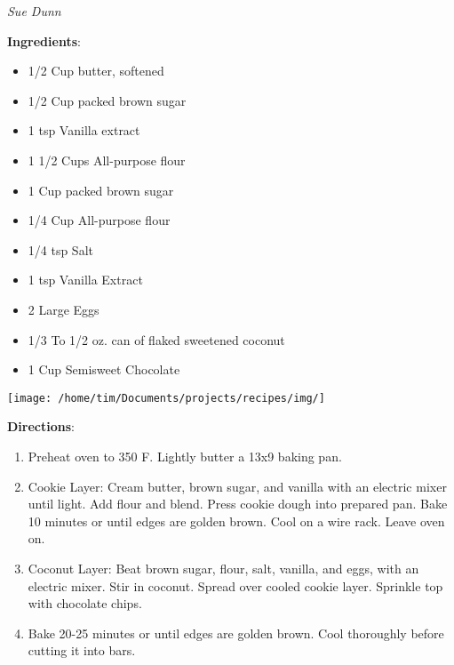 \documentclass[11pt, twoside, openany]{book}
\begin{document}
 \label{island-gem-bars}\hfill\textit{Sue Dunn}\\
\begin{minipage}[t]{0.8\linewidth}
\textbf{Ingredients}:\vspace{-3mm}
\begin{multicols}{2}
\begin{itemize}\setlength\itemsep{-1mm}
\item 1/2 Cup butter, softened
\item 1/2 Cup packed brown sugar
\item 1 tsp Vanilla extract
\item 1 1/2 Cups All-purpose flour
\item 1 Cup packed brown sugar
\item 1/4 Cup All-purpose flour
\item 1/4 tsp Salt
\item 1 tsp Vanilla Extract
\item 2 Large Eggs
\item 1/3 To 1/2 oz. can of flaked sweetened coconut
\item 1 Cup Semisweet Chocolate
\end{itemize}
\end{multicols}
\end{minipage}
\begin{minipage}[t]{0.2\linewidth}
\centering \strut\vspace*{-\baselineskip}\newline
\texttt{[image: /home/tim/Documents/projects/recipes/img/]}\\
\end{minipage}\vspace{3mm}
\textbf{Directions}:
\vspace{-3mm}\begin{enumerate}\setlength\itemsep{-1mm}
\item Preheat oven to 350 F. Lightly butter a 13x9 baking pan.
\item Cookie Layer: Cream butter, brown sugar, and vanilla with an electric mixer until light. Add flour and blend. Press cookie dough into prepared pan. Bake 10 minutes or until edges are golden brown. Cool on a wire rack. Leave oven on.
\item Coconut Layer: Beat brown sugar, flour, salt, vanilla, and eggs, with an electric mixer. Stir in coconut. Spread over cooled cookie layer. Sprinkle top with chocolate chips. 
\item Bake 20-25 minutes or until edges are golden brown. Cool thoroughly before cutting it into bars.
\end{enumerate}
\end{document}
